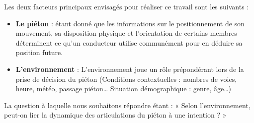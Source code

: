 Les deux facteurs principaux envisagés pour réaliser ce travail sont les suivants :

\begin{itemize}
    \item  \textbf{Le piéton} : étant donné que les informations sur le positionnement de son mouvement, sa disposition physique et l'orientation de certains membres déterminent ce qu'un conducteur utilise communément pour en déduire sa position future.
    \item \textbf{L’environnement} : L’environnement joue un rôle prépondérant lors de la prise de décision du piéton (Conditions contextuelles : nombres de voies, heure, météo, passage piéton… Situation démographique : genre, âge…)
\end{itemize}

La question à laquelle nous souhaitons répondre étant : « Selon l’environnement, peut-on lier la dynamique des articulations du piéton à une intention ? »















